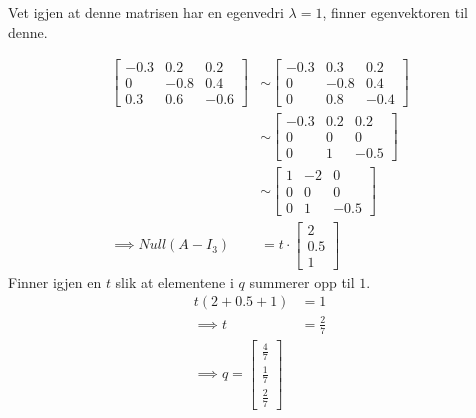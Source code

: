 \documentclass[11pt, a4paper, norsk]{NTNUoving}
\begin{document}
\begin{oppgave}
\begin{punkt}
           Vet igjen at denne matrisen har en egenvedri $\lambda = 1$, finner egenvektoren til denne.

           \begin{align*}
                \begin{bmatrix}
                    -0.3 & 0.2 & 0.2 \\
                   0 & -0.8 & 0.4 \\
                   0.3 & 0.6 & -0.6
                \end{bmatrix} &\sim \begin{bmatrix}
           -0.3 & 0.3 & 0.2 \\
           0 & -0.8 & 0.4 \\
           0 & 0.8 & -0.4
           \end{bmatrix}
           \\            
           &\sim \begin{bmatrix}
               -0.3 & 0.2 & 0.2 \\
               0 & 0 & 0  \\
               0 & 1 & -0.5
           \end{bmatrix}
           \\
           &\sim \begin{bmatrix}
               1 & -2 & 0 \\
               0 & 0 & 0 \\
               0 & 1 & -0.5
           \end{bmatrix}
           \\
               \implies Null(A - I_{3}) &= t\cdot \begin{bmatrix}
                   2 \\
                   0.5 \\
                   1
               \end{bmatrix}
           \end{align*}
           Finner igjen en $t$ slik at elementene i $q$ summerer opp til $1$.
           \begin{align*}
               t(2 + 0.5 + 1) &= 1
                \\
               \implies t &= \frac{2}{7}
               \\
               \implies q = \begin{bmatrix}
                   \frac{4}{7} \\
                   \frac{1}{7} \\
                   \frac{2}{7}
               \end{bmatrix}
           \end{align*}
       \end{punkt}
   \end{oppgave}
\end{document}
